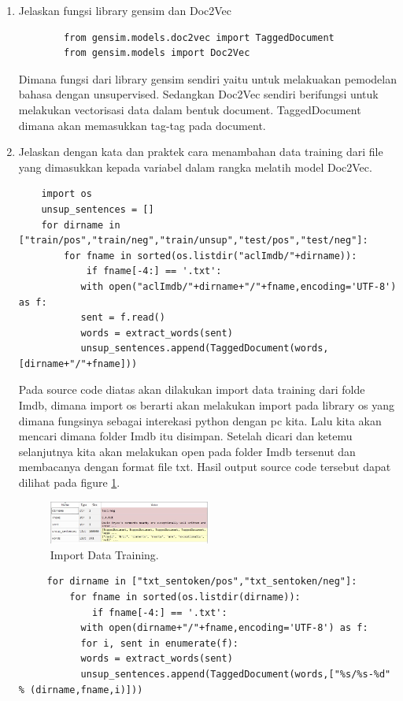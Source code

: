 \begin{enumerate}
\item Jelaskan fungsi library gensim dan Doc2Vec

	\begin{verbatim}
		from gensim.models.doc2vec import TaggedDocument
		from gensim.models import Doc2Vec
	\end{verbatim}	

	\subitem Dimana fungsi dari library gensim sendiri yaitu untuk melakuakan pemodelan bahasa dengan unsupervised. Sedangkan Doc2Vec sendiri berifungsi untuk melakukan vectorisasi data dalam bentuk document. TaggedDocument dimana akan memasukkan tag-tag pada document.

\item Jelaskan dengan kata dan praktek cara menambahan data training dari file yang dimasukkan kepada variabel dalam rangka melatih model Doc2Vec.


	\begin{verbatim}
	import os
	unsup_sentences = []
	for dirname in ["train/pos","train/neg","train/unsup","test/pos","test/neg"]:
    	for fname in sorted(os.listdir("aclImdb/"+dirname)):
        	if fname[-4:] == '.txt':
           with open("aclImdb/"+dirname+"/"+fname,encoding='UTF-8') as f:
           sent = f.read()
           words = extract_words(sent)
           unsup_sentences.append(TaggedDocument(words,[dirname+"/"+fname]))
	\end{verbatim}

	\subitem Pada source code diatas akan dilakukan import data training dari folde Imdb, dimana import os berarti akan melakukan import pada library os yang dimana fungsinya sebagai interekasi python dengan pc kita. Lalu kita akan mencari dimana folder Imdb itu disimpan. Setelah dicari dan ketemu selanjutnya kita akan melakukan open pada folder Imdb tersenut dan membacanya dengan format file txt. Hasil output source code tersebut dapat dilihat pada figure \ref{YNC5-22}.

	\begin{figure}[!htbp]
		\centerline{\includegraphics[width=0.5\textwidth]{figures/YN/Chapter5/Praktek/YNC5-22.jpeg}}
		\caption{Import Data Training.}
		\label{YNC5-22}
	\end{figure}

	\begin{verbatim}
	 for dirname in ["txt_sentoken/pos","txt_sentoken/neg"]:
    	 for fname in sorted(os.listdir(dirname)):
        	 if fname[-4:] == '.txt':
           with open(dirname+"/"+fname,encoding='UTF-8') as f:
           for i, sent in enumerate(f):
           words = extract_words(sent)
           unsup_sentences.append(TaggedDocument(words,["%s/%s-%d" % (dirname,fname,i)]))
	\end{verbatim}


\end{enumerate}
